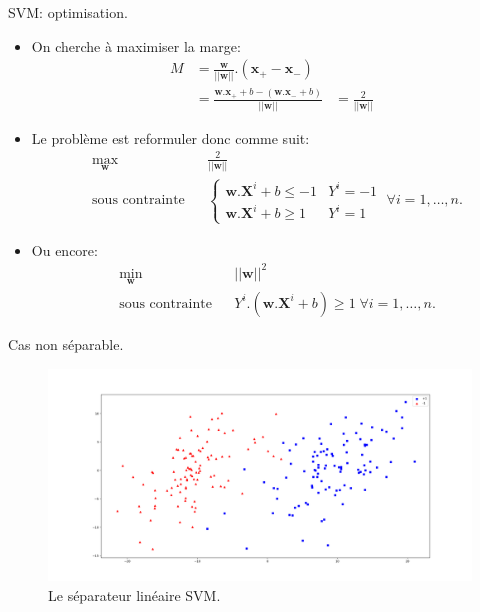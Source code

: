 \documentclass[8pt]{beamer}
\begin{document}
		\begin{frame}{SVM\@: optimisation.}
			\begin{itemize}
				\item  On cherche à maximiser la marge:
				\begin{align}
					M &= \frac{\textbf{w}}{\vert\vert \textbf{w} \vert\vert}.(\textbf{x}_+ - \textbf{x}_-) \\
					&= \frac{\textbf{w}.\textbf{x}_+ + b - (\textbf{w}.\textbf{x}_- + b)}{\vert\vert \textbf{w} \vert\vert}
					&= \frac{2}{\vert\vert \textbf{w} \vert\vert}
				\end{align}
				\item  Le problème est reformuler donc comme suit:
				\begin{equation}
					\begin{aligned}
					& \max_{\textbf{w}}
					& & \frac{2}{\vert\vert \textbf{w} \vert\vert} \\
					& \text{sous contrainte}
					& & \begin{cases}
						\textbf{w}.\textbf{X}^i + b \leq -1 & Y^i = -1 \\
						\textbf{w}.\textbf{X}^i + b \geq 1 & Y^i = 1
					\end{cases} \; \forall i = 1, \dots, n.
					\end{aligned}
				\end{equation}
				\item  Ou encore:
				\begin{equation}
					\begin{aligned}
					& \min_{\textbf{w}}
					& & {\vert\vert \textbf{w} \vert\vert}^2 \\
					& \text{sous contrainte}
					& & Y^i.(\textbf{w}.\textbf{X}^i + b) \geq 1 \; \forall i = 1, \dots, n.
					\end{aligned}
				\end{equation}
			\end{itemize}
		\end{frame}

		\begin{frame}{Cas non séparable.}
			\begin{figure}[H]
				\includegraphics[width=\textwidth]{images/samples/non_separable}
				\caption{\label{fig::non_sep} Le séparateur linéaire SVM.}
			\end{figure}
		\end{frame}
\end{document}

